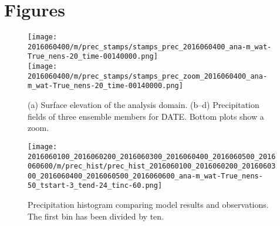 \documentclass[a4paper, 12pt]{article}
\begin{document}
% 



\newpage

{\small
 }

\newpage
\section{Figures}

\begin{figure}[h!]
\noindent \centering
\texttt{[image: 2016060400/m/prec\_stamps/stamps\_prec\_2016060400\_ana-m\_wat-True\_nens-20\_time-00140000.png]}\\
\texttt{[image: 2016060400/m/prec\_stamps/stamps\_prec\_zoom\_2016060400\_ana-m\_wat-True\_nens-20\_time-00140000.png]}\\
\caption{(a) Surface elevation of the analysis domain. (b--d) Precipitation fields of three ensemble members for DATE. Bottom plots show a zoom.} \label{fig:prec_stamps}
\end{figure}

\begin{figure}[h!]
\noindent \centering
\texttt{[image: 2016060100\_2016060200\_2016060300\_2016060400\_2016060500\_2016060600/m/prec\_hist/prec\_hist\_2016060100\_2016060200\_2016060300\_2016060400\_2016060500\_2016060600\_ana-m\_wat-True\_nens-50\_tstart-3\_tend-24\_tinc-60.png]}\\
\caption{Precipitation histogram comparing model results and observations. The first bin has been divided by ten.} \label{fig:prec_hist}
\end{figure}
\end{document}
